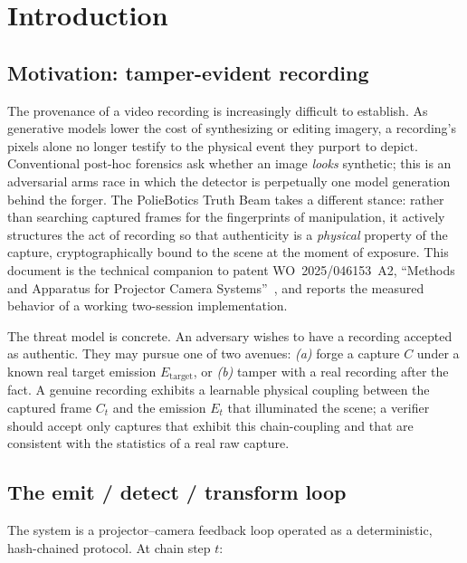\section{Introduction}\label{sec:intro}

\subsection{Motivation: tamper-evident recording}

The provenance of a video recording is increasingly difficult to establish. As generative models lower the cost of synthesizing or editing imagery, a recording's pixels alone no longer testify to the physical event they purport to depict. Conventional post-hoc forensics ask whether an image \emph{looks} synthetic; this is an adversarial arms race in which the detector is perpetually one model generation behind the forger. The PolieBotics Truth Beam takes a different stance: rather than searching captured frames for the fingerprints of manipulation, it actively structures the act of recording so that authenticity is a \emph{physical} property of the capture, cryptographically bound to the scene at the moment of exposure. This document is the technical companion to patent WO~2025/046153~A2, ``Methods and Apparatus for Projector Camera Systems''~\cite{patent2025}, and reports the measured behavior of a working two-session implementation.

The threat model is concrete. An adversary wishes to have a recording accepted as authentic. They may pursue one of two avenues: \emph{(a)} forge a capture $C$ under a known real target emission $E_{\text{target}}$, or \emph{(b)} tamper with a real recording after the fact. A genuine recording exhibits a learnable physical coupling between the captured frame $C_t$ and the emission $E_t$ that illuminated the scene; a verifier should accept only captures that exhibit this chain-coupling and that are consistent with the statistics of a real raw capture.

\subsection{The emit / detect / transform loop}

The system is a projector--camera feedback loop operated as a deterministic, hash-chained protocol. At chain step $t$:

